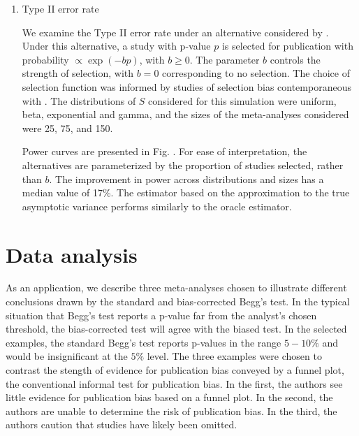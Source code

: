 \documentclass[12pt]{article}
\newcommand{\s}{S}
\newcommand{\comment}[1]{
  \iftoggle{commenttoggle}{
    {\normalsize{\color{red}{ #1}}\normalsize}
  }
  {}
}
\begin{document}
\begin{enumerate}
    
  \item Type II error rate

    We examine the Type II error rate under an alternative considered
    by \citet{begg1994a}. Under this alternative, a study with p-value $p$
    is selected for publication with probability $\propto\exp(-bp)$,
    with $b\ge 0$. The parameter $b$ controls the strength of
    selection, with $b=0$ corresponding to no selection. The choice of
    selection function was informed by studies of selection bias
    contemporaneous with \citet{begg1994a}. The distributions of $\s$
    considered for this simulation were uniform, beta, exponential and gamma, and the sizes
    of the meta-analyses considered were 25, 75, and 150.

    Power curves are presented in Fig. . For
    ease of interpretation, the alternatives are parameterized by the
    proportion of studies selected, rather than $b$. The improvement
    in power across distributions and sizes has a median value of
    17\%.  The estimator based on the approximation to the true
    asymptotic variance performs similarly to the oracle estimator.%
    
  \end{enumerate}
  

    \section{Data analysis}\label{section:data analysis}

    As an application, we describe three meta-analyses chosen to
    illustrate different conclusions drawn by the standard and
    bias-corrected Begg's test. In the typical situation that Begg's
    test reports a p-value far from the analyst's chosen threshold, the
    bias-corrected test will agree with the biased test. In the
    selected examples, the standard Begg's test reports p-values in the range
    $5-10\%$ and would be insignificant at the $5\%$ level. The three
    examples were chosen to contrast the stength of evidence for
    publication bias conveyed by a funnel plot, the conventional
    informal test for publication bias. In the first, the authors see
    little evidence for publication bias based on a funnel plot. In
    the second, the authors are unable to determine the risk of
    publication bias. In the third, the authors caution that studies
    have likely been omitted.
    
\end{document}
